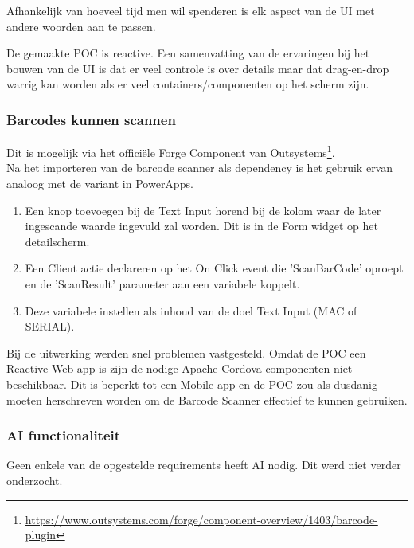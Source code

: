 Afhankelijk van hoeveel tijd men wil spenderen is elk aspect van de UI met andere woorden aan te passen.

De gemaakte POC is reactive. Een samenvatting van de ervaringen bij het bouwen van de UI is dat er veel controle is over details maar dat drag-en-drop warrig kan worden als er veel containers/componenten op het scherm zijn.

\subsubsection{Barcodes kunnen scannen}
\label{subsec:os-barcode}

Dit is mogelijk via het officiële Forge Component van Outsystems\footnote{\url{https://www.outsystems.com/forge/component-overview/1403/barcode-plugin}}.\\
Na het importeren van de barcode scanner als dependency is het gebruik ervan analoog met de variant in PowerApps.
\begin{enumerate}
    \item Een knop toevoegen bij de Text Input horend bij de kolom waar de later ingescande waarde ingevuld zal worden. Dit is in de Form widget op het detailscherm.
    \item Een Client actie declareren op het On Click event die 'ScanBarCode' oproept en de 'ScanResult' parameter aan een variabele koppelt.
    \item Deze variabele instellen als inhoud van de doel Text Input (MAC of SERIAL).
\end{enumerate}

Bij de uitwerking werden snel problemen vastgesteld. Omdat de POC een Reactive Web app is zijn de nodige Apache Cordova componenten niet beschikbaar. Dit is beperkt tot een Mobile app en de POC zou als dusdanig moeten herschreven worden om de Barcode Scanner effectief te kunnen gebruiken.

\subsubsection{AI functionaliteit}

Geen enkele van de opgestelde requirements heeft AI nodig. Dit werd niet verder onderzocht.

